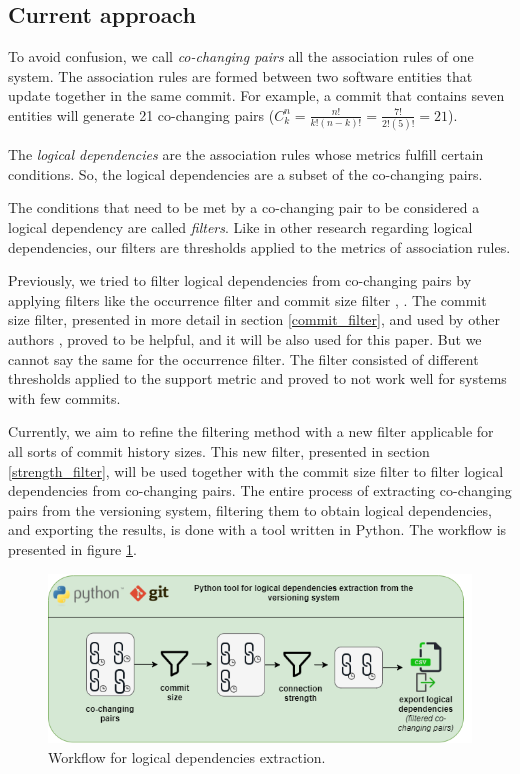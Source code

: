 \documentclass[runningheads]{comsis2}
\newcommand*{\Comb}[2]{{}C^{#1}_{#2}}%
\begin{document}
\subsection{Current approach}
\label{current_approach}

To avoid confusion, we call \textit{co-changing pairs} all the association rules of one system. The association rules are formed between two software entities that update together in the same commit.
For example, a commit that contains seven entities will generate 21 co-changing pairs ($\Comb{n}{k}=\frac{n!}{k!(n-k)!} = \frac{7!}{2!(5)!} = 21$).


The \textit{logical dependencies} are the association rules whose metrics fulfill certain conditions. So, the logical dependencies are a subset of the co-changing pairs. 

The conditions that need to be met by a co-changing pair to be considered a logical dependency are called \textit{filters}. Like in other research regarding logical dependencies, our filters are thresholds applied to the metrics of association rules. 

Previously, we tried to filter logical dependencies from co-changing pairs by applying filters like the occurrence filter and commit size filter \cite{saci19}, \cite{enase19}. 
The commit size filter, presented in more detail in section \ref{commit_filter}, and used by other authors \cite{DBLP:journals/jss/AjienkaC17}, proved to be helpful, and it will be also used for this paper. 
But we cannot say the same for the occurrence filter. The filter consisted of different thresholds applied to the support metric and proved to not work well for systems with few commits.

Currently, we aim to refine the filtering method with a new filter applicable for all sorts of commit history sizes. This new filter, presented in section \ref{strength_filter}, will be used together with the commit size filter to filter logical dependencies from co-changing pairs. The entire process of extracting co-changing pairs from the versioning system, filtering them to obtain logical dependencies, and exporting the results, is done with a tool written in Python. The workflow is presented in figure \ref{fig:workflow_key}.

\begin{figure}
\centering
\includegraphics[width=\textwidth]{ld_workflow.png}
\caption{Workflow for logical dependencies extraction.}
\label{fig:workflow_key}
\centering
\end{figure}
\end{document}
